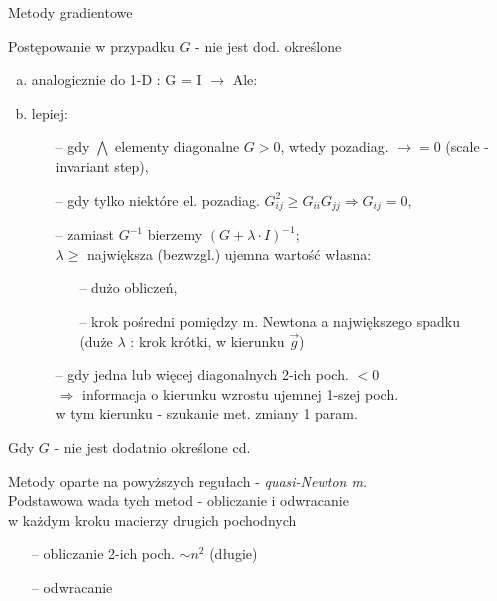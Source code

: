   \begin{frame}{Metody gradientowe}

 	\begin{block}{Postępowanie w przypadku $G$ - nie jest dod. określone}
 	   \begin{enumerate}[a)]
 	   		\item analogicznie do 1-D : G = I $\rightarrow$ Ale:
 	   		\item lepiej:
 	   		\begin{itemize}
 	   			\item[--] gdy $\bigwedge$ elementy diagonalne $G > 0$, wtedy pozadiag. $\rightarrow = 0$ (scale - invariant step),
 	   			\item[--] gdy tylko niektóre el. pozadiag. $G_{ij}^2 \geq G_{ii}G_{jj} \Rightarrow G_{ij} = 0$,
 	   			\item[--] zamiast $G^{-1}$ bierzemy $(G + \lambda \cdot I)^{-1}$;
 	   			\\ $\lambda \geq$ największa (bezwzgl.) ujemna wartość własna:
 	   			\begin{itemize}
 	   				\item[--] dużo obliczeń,
 	   				\item[--] krok pośredni pomiędzy m. Newtona a największego spadku
 	   				\\(duże $\lambda$ : krok krótki, w kierunku $\vec{g}$)
 	   			\end{itemize}
 	   			\item[--] gdy jedna lub więcej diagonalnych 2-ich poch. $< 0$
 	   			\\ $\Rightarrow$ informacja o kierunku wzrostu ujemnej 1-szej poch.
 	   			\\w tym kierunku - szukanie met. zmiany 1 param.
 	   		\end{itemize}
 	   \end{enumerate}
 	\end{block}

  \end{frame}

  \begin{frame}{Gdy $G$ - nie jest dodatnio określone cd.}

 	\begin{block}{}
 	Metody oparte na powyższych regułach - \emph{quasi-Newton m.}
 	\medskip
 	\\Podstawowa wada tych metod - obliczanie i odwracanie
 	\\w każdym kroku macierzy drugich pochodnych
 	\smallskip
 	   	\begin{itemize}
 	   		\item[--] obliczanie 2-ich poch. $\sim n^2$ (długie)
 	   		\item[--] odwracanie
 	   	\end{itemize}
 	\end{block}

  \end{frame}

